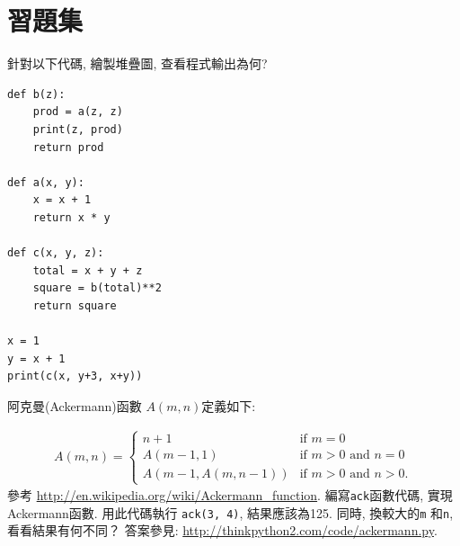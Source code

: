 \documentclass[10pt]{book}
\begin{document}
\section{習題集}

\begin{exercise}
針對以下代碼, 繪製堆疊圖, 查看程式輸出為何?

\begin{verbatim}
def b(z):
    prod = a(z, z)
    print(z, prod)
    return prod

def a(x, y):
    x = x + 1
    return x * y

def c(x, y, z):
    total = x + y + z
    square = b(total)**2
    return square

x = 1
y = x + 1
print(c(x, y+3, x+y))
\end{verbatim}

\end{exercise}


\begin{exercise}
\label{ackermann}

阿克曼(Ackermann)函數 $A(m, n)$定義如下:

\begin{eqnarray*}
A(m, n) = \begin{cases} 
              n+1 & \mbox{if } m = 0 \\ 
        A(m-1, 1) & \mbox{if } m > 0 \mbox{ and } n = 0 \\ 
A(m-1, A(m, n-1)) & \mbox{if } m > 0 \mbox{ and } n > 0.
\end{cases} 
\end{eqnarray*}
%
參考 \url{http://en.wikipedia.org/wiki/Ackermann_function}.
編寫{\tt ack}函數代碼, 實現Ackermann函數. 
用此代碼執行 {\tt ack(3, 4)}, 結果應該為125. 
同時, 換較大的{\tt m} 和{\tt n}, 看看結果有何不同？
答案參見: \url{http://thinkpython2.com/code/ackermann.py}.

\end{exercise}
\end{document}
